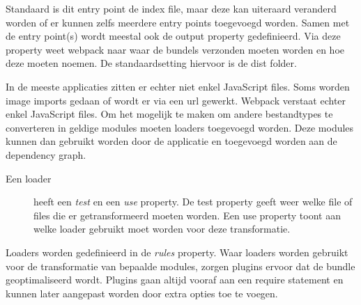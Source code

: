Standaard is dit entry point de index file, maar deze kan uiteraard veranderd worden of er kunnen zelfs meerdere entry points toegevoegd worden. Samen met de entry point(s) wordt meestal ook de output property gedefinieerd. Via deze property weet webpack naar waar de bundels verzonden moeten worden en hoe deze moeten noemen. De standaardsetting hiervoor is de dist folder.

In de meeste applicaties zitten er echter niet enkel JavaScript files. Soms worden image imports gedaan of wordt er via een url gewerkt. Webpack verstaat echter enkel JavaScript files. Om het mogelijk te maken om andere bestandtypes te converteren in geldige modules moeten loaders toegevoegd worden. Deze modules kunnen dan gebruikt worden door de applicatie en toegevoegd worden aan de dependency graph. 

\begin{description}
	\item[Een loader] heeft een \textit{test} en een \textit{use} property. De test property geeft weer welke file of files die er getransformeerd moeten worden. Een use property toont aan welke loader gebruikt moet worden voor deze transformatie.
\end{description}

Loaders worden gedefinieerd in de \textit{rules} property.
Waar loaders worden gebruikt voor de transformatie van bepaalde modules, zorgen plugins ervoor dat de bundle geoptimaliseerd wordt. Plugins gaan altijd vooraf aan een require statement en kunnen later aangepast worden door extra opties toe te voegen. 